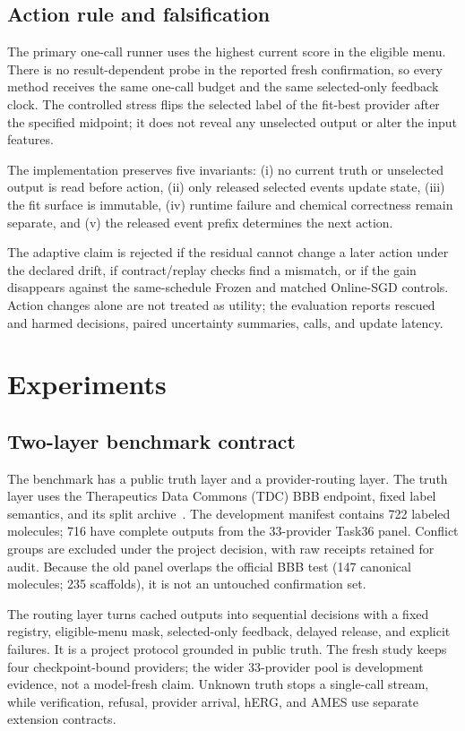 \documentclass[sigconf,anonymous]{aamas}
\begin{document}
\subsection{Action rule and falsification}
The primary one-call runner uses the highest current score in the eligible menu. There is no result-dependent probe in the reported fresh confirmation, so every method receives the same one-call budget and the same selected-only feedback clock. The controlled stress flips the selected label of the fit-best provider after the specified midpoint; it does not reveal any unselected output or alter the input features.

The implementation preserves five invariants: (i) no current truth or unselected output is read before action, (ii) only released selected events update state, (iii) the fit surface is immutable, (iv) runtime failure and chemical correctness remain separate, and (v) the released event prefix determines the next action.

The adaptive claim is rejected if the residual cannot change a later action under the declared drift, if contract/replay checks find a mismatch, or if the gain disappears against the same-schedule Frozen and matched Online-SGD controls. Action changes alone are not treated as utility; the evaluation reports rescued and harmed decisions, paired uncertainty summaries, calls, and update latency.

\section{Experiments}
\subsection{Two-layer benchmark contract}
The benchmark has a public truth layer and a provider-routing layer. The truth layer uses the Therapeutics Data Commons (TDC) BBB endpoint, fixed label semantics, and its split archive~\cite{huang2021tdc}. The development manifest contains 722 labeled molecules; 716 have complete outputs from the 33-provider Task36 panel. Conflict groups are excluded under the project decision, with raw receipts retained for audit. Because the old panel overlaps the official BBB test (147 canonical molecules; 235 scaffolds), it is not an untouched confirmation set.

The routing layer turns cached outputs into sequential decisions with a fixed registry, eligible-menu mask, selected-only feedback, delayed release, and explicit failures. It is a project protocol grounded in public truth. The fresh study keeps four checkpoint-bound providers; the wider 33-provider pool is development evidence, not a model-fresh claim. Unknown truth stops a single-call stream, while verification, refusal, provider arrival, hERG, and AMES use separate extension contracts.
\end{document}
